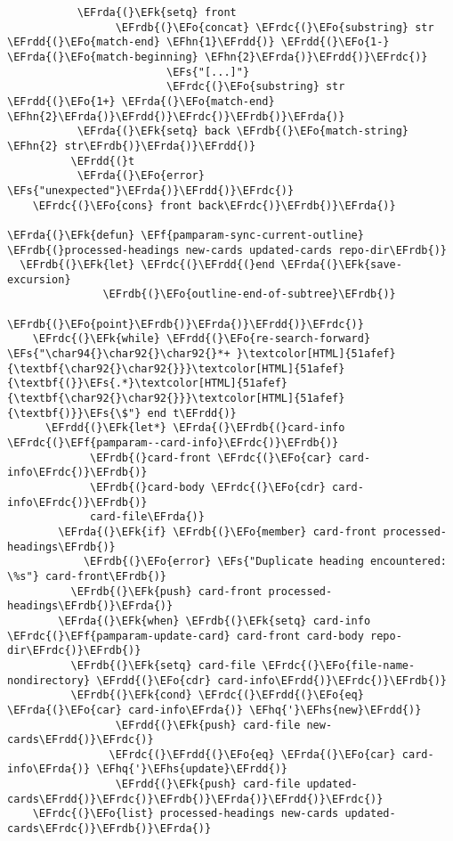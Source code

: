 \documentclass[a4wide,10pt]{article}
\newcommand{\EFs}[1]{\textcolor{EFs}{#1}} %
\newcommand{\EFk}[1]{\textcolor{EFk}{#1}} %
\newcommand{\EFf}[1]{\textcolor{EFf}{#1}} %
\newcommand{\EFo}[1]{\textcolor{EFo}{#1}} %
\newcommand{\EFhn}[1]{\textcolor{EFhn}{\textbf{#1}}} %
\newcommand{\EFhq}[1]{\textcolor{EFhq}{#1}} %
\newcommand{\EFhs}[1]{\textcolor{EFhs}{#1}} %
\newcommand{\EFrda}[1]{\textcolor{EFrda}{#1}} %
\newcommand{\EFrdb}[1]{\textcolor{EFrdb}{#1}} %
\newcommand{\EFrdc}[1]{\textcolor{EFrdc}{#1}} %
\newcommand{\EFrdd}[1]{\textcolor{EFrdd}{#1}} %
\begin{document}
\begin{Code}
\begin{Verbatim}
           \EFrda{(}\EFk{setq} front
                 \EFrdb{(}\EFo{concat} \EFrdc{(}\EFo{substring} str \EFrdd{(}\EFo{match-end} \EFhn{1}\EFrdd{)} \EFrdd{(}\EFo{1-} \EFrda{(}\EFo{match-beginning} \EFhn{2}\EFrda{)}\EFrdd{)}\EFrdc{)}
                         \EFs{"[...]"}
                         \EFrdc{(}\EFo{substring} str \EFrdd{(}\EFo{1+} \EFrda{(}\EFo{match-end} \EFhn{2}\EFrda{)}\EFrdd{)}\EFrdc{)}\EFrdb{)}\EFrda{)}
           \EFrda{(}\EFk{setq} back \EFrdb{(}\EFo{match-string} \EFhn{2} str\EFrdb{)}\EFrda{)}\EFrdd{)}
          \EFrdd{(}t
           \EFrda{(}\EFo{error} \EFs{"unexpected"}\EFrda{)}\EFrdd{)}\EFrdc{)}
    \EFrdc{(}\EFo{cons} front back\EFrdc{)}\EFrdb{)}\EFrda{)}

\EFrda{(}\EFk{defun} \EFf{pamparam-sync-current-outline} \EFrdb{(}processed-headings new-cards updated-cards repo-dir\EFrdb{)}
  \EFrdb{(}\EFk{let} \EFrdc{(}\EFrdd{(}end \EFrda{(}\EFk{save-excursion}
               \EFrdb{(}\EFo{outline-end-of-subtree}\EFrdb{)}
               \EFrdb{(}\EFo{point}\EFrdb{)}\EFrda{)}\EFrdd{)}\EFrdc{)}
    \EFrdc{(}\EFk{while} \EFrdd{(}\EFo{re-search-forward} \EFs{"\char94{}\char92{}\char92{}*+ }\textcolor[HTML]{51afef}{\textbf{\char92{}\char92{}}}\textcolor[HTML]{51afef}{\textbf{(}}\EFs{.*}\textcolor[HTML]{51afef}{\textbf{\char92{}\char92{}}}\textcolor[HTML]{51afef}{\textbf{)}}\EFs{\$"} end t\EFrdd{)}
      \EFrdd{(}\EFk{let*} \EFrda{(}\EFrdb{(}card-info \EFrdc{(}\EFf{pamparam--card-info}\EFrdc{)}\EFrdb{)}
             \EFrdb{(}card-front \EFrdc{(}\EFo{car} card-info\EFrdc{)}\EFrdb{)}
             \EFrdb{(}card-body \EFrdc{(}\EFo{cdr} card-info\EFrdc{)}\EFrdb{)}
             card-file\EFrda{)}
        \EFrda{(}\EFk{if} \EFrdb{(}\EFo{member} card-front processed-headings\EFrdb{)}
            \EFrdb{(}\EFo{error} \EFs{"Duplicate heading encountered: \%s"} card-front\EFrdb{)}
          \EFrdb{(}\EFk{push} card-front processed-headings\EFrdb{)}\EFrda{)}
        \EFrda{(}\EFk{when} \EFrdb{(}\EFk{setq} card-info \EFrdc{(}\EFf{pamparam-update-card} card-front card-body repo-dir\EFrdc{)}\EFrdb{)}
          \EFrdb{(}\EFk{setq} card-file \EFrdc{(}\EFo{file-name-nondirectory} \EFrdd{(}\EFo{cdr} card-info\EFrdd{)}\EFrdc{)}\EFrdb{)}
          \EFrdb{(}\EFk{cond} \EFrdc{(}\EFrdd{(}\EFo{eq} \EFrda{(}\EFo{car} card-info\EFrda{)} \EFhq{'}\EFhs{new}\EFrdd{)}
                 \EFrdd{(}\EFk{push} card-file new-cards\EFrdd{)}\EFrdc{)}
                \EFrdc{(}\EFrdd{(}\EFo{eq} \EFrda{(}\EFo{car} card-info\EFrda{)} \EFhq{'}\EFhs{update}\EFrdd{)}
                 \EFrdd{(}\EFk{push} card-file updated-cards\EFrdd{)}\EFrdc{)}\EFrdb{)}\EFrda{)}\EFrdd{)}\EFrdc{)}
    \EFrdc{(}\EFo{list} processed-headings new-cards updated-cards\EFrdc{)}\EFrdb{)}\EFrda{)}


\end{Verbatim}
\end{Code}
\end{document}
